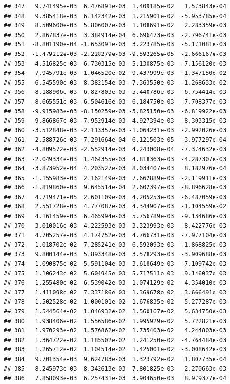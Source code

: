 \documentclass[
]{article}
\begin{document}
\begin{verbatim}
## 347   9.741495e-03  6.476891e-03  1.409185e-02   1.573843e-04
## 348   9.385418e-03  6.142342e-03  1.215901e-02  -5.953785e-04
## 349   8.509600e-03  5.806007e-03  1.108691e-02   2.283359e-03
## 350   2.867837e-03  3.384914e-04  6.696473e-03  -2.796741e-03
## 351  -8.801190e-04 -1.653091e-03  3.223785e-03  -5.171081e-03
## 352  -1.479212e-03 -2.228279e-03 -9.592265e-05  -2.666167e-03
## 353  -4.516825e-03 -6.730315e-03 -5.130875e-03  -7.156120e-03
## 354  -7.945791e-03 -1.046520e-02 -9.437999e-03  -1.347150e-02
## 355  -6.545590e-03 -8.382154e-03 -7.363550e-03  -1.268633e-02
## 356  -8.188906e-03 -6.827803e-03 -5.440786e-03  -6.754414e-03
## 357  -8.665551e-03 -6.504616e-03 -6.184750e-03  -7.708377e-03
## 358  -9.915983e-03 -8.150259e-03 -5.825150e-03  -6.819922e-03
## 359  -9.866867e-03 -7.952914e-03 -4.927394e-03  -8.303315e-03
## 360  -3.512848e-03 -2.113357e-03 -1.064231e-03  -2.992026e-03
## 361  -2.588726e-03 -7.291664e-04 -6.121503e-05  -3.977297e-04
## 362  -4.809572e-03 -2.552914e-03  4.243008e-04  -7.374632e-03
## 363  -2.049334e-03  1.464355e-03  4.818363e-03  -4.287307e-03
## 364  -3.873952e-04  4.203527e-03  8.034407e-03   8.182976e-04
## 365  -1.155983e-03  2.162149e-03  7.662889e-03  -2.119911e-03
## 366  -1.819860e-03  9.645514e-04  2.602397e-03  -8.896628e-03
## 367   4.719471e-05  2.601109e-03  4.205253e-03  -6.487059e-03
## 368   2.551728e-03  4.777087e-03  4.344907e-03  -1.104559e-02
## 369   4.161459e-03  6.465994e-03  5.756789e-03  -9.134686e-03
## 370   3.010016e-03  4.222593e-03  3.323993e-03  -8.422776e-03
## 371   4.705257e-03  4.174752e-03  4.766731e-03  -7.977104e-03
## 372   1.018702e-02  7.285241e-03  6.592093e-03  -1.868825e-03
## 373   9.800144e-03  5.893348e-03  3.578293e-03  -3.909688e-03
## 374   1.090875e-02  5.591104e-03  3.618649e-03  -7.109742e-03
## 375   1.106243e-02  5.604945e-03  5.717511e-03  -9.146037e-03
## 376   1.255480e-02  6.539042e-03  1.074129e-02  -4.354010e-03
## 377   1.411098e-02  7.337186e-03  1.369678e-02  -3.666491e-03
## 378   1.502528e-02  1.000101e-02  1.676835e-02   5.277287e-03
## 379   1.544564e-02  1.046932e-02  1.560167e-02   5.634750e-03
## 380   1.938406e-02  1.556586e-02  1.995929e-02   5.722821e-03
## 381   1.970293e-02  1.576862e-02  1.735403e-02   4.244803e-03
## 382   1.364722e-02  1.185502e-02  1.241250e-02  -4.764484e-03
## 383   1.265712e-02  1.104514e-02  1.425001e-02  -3.008642e-03
## 384   9.701354e-03  9.624783e-03  1.323792e-02   1.807735e-04
## 385   8.245973e-03  8.342613e-03  7.801825e-03   2.270663e-03
## 386   7.858093e-03  6.257431e-03  3.904650e-03   8.979377e-04

\end{verbatim}
\end{document}
